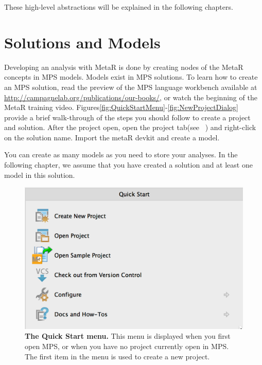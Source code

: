 These high-level abstractions will be explained in the following chapters.

\section{Solutions and Models}
Developing an analysis with MetaR is done by creating nodes of the MetaR concepts in MPS models. Models exist in MPS solutions. To learn how to create an MPS solution, read the preview of the MPS language workbench available at \url{http://campagnelab.org/publications/our-books/}\cite{campagne2014mps}, or watch the beginning of the MetaR training video. Figures\ref{fig:QuickStartMenu}-\ref{fig:NewProjectDialog} provide a brief walk-through of the steps you should follow to create a project and solution. After the project open, open the project tab(see ~\cite{campagne2014mps}) and right-click on the solution name. Import the metaR devkit and create a model. 

You can create as many models as you need to store your analyses. In the following chapter, we assume that you have created a solution and at least one model in this solution. 


\begin{figure}
  \includegraphics[width=\figWidthNarrow]{figures/QuickStart.png}
  \caption[The Quick Start menu.]{\textbf{The Quick Start menu.} This menu is displayed when you first open MPS, or when you have no project currently open in MPS. The first item in the menu is used to create a new project. 
}
\end{figure}\label{fig:QuickStartMenu}

